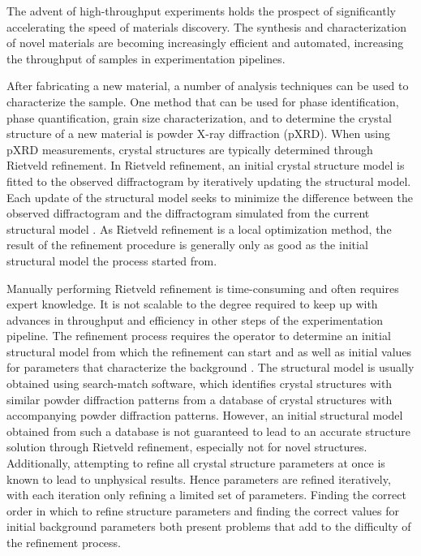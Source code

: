 The advent of high-throughput experiments holds the prospect of significantly accelerating the speed of materials discovery\cite{Liu2019}. The synthesis and characterization of novel materials are becoming increasingly efficient and automated, increasing the throughput of samples in experimentation pipelines\cite{MacLeod2019, Ludwig2019, Ozaki2020}.

After fabricating a new material, a number of analysis techniques can be used to characterize the sample. One method that can be used for phase identification, phase quantification, grain size characterization, and to determine the crystal structure of a new material is powder X-ray diffraction (pXRD). 
When using pXRD measurements, crystal structures are typically determined through Rietveld refinement. In Rietveld refinement, an initial crystal structure model is fitted to the observed diffractogram by iteratively updating the structural model. Each update of the structural model seeks to minimize the difference between the observed diffractogram and the diffractogram simulated from the current structural model \cite{Dinnebier2019, Cano2021}. As Rietveld refinement is a local optimization method, the result of the refinement procedure is generally only as good as the initial structural model the process started from.

Manually performing Rietveld refinement is time-consuming and often requires expert knowledge. It is not scalable to the degree required to keep up with advances in throughput and efficiency in other steps of the experimentation pipeline. The refinement process requires the operator to determine an initial structural model from which the refinement can start and as well as initial values for parameters that characterize the background \cite{mccusker1999}. The structural model is usually obtained using search-match software, which identifies crystal structures with similar powder diffraction patterns from a database of crystal structures with accompanying powder diffraction patterns. However, an initial structural model obtained from such a database is not guaranteed to lead to an accurate structure solution through Rietveld refinement, especially not for novel structures. Additionally, attempting to refine all crystal structure parameters at once is known to lead to unphysical results\cite{Ozaki2020}. Hence parameters are refined iteratively, with each iteration only refining a limited set of parameters. Finding the correct order in which to refine structure parameters and finding the correct values for initial background parameters both present problems that add to the difficulty of the refinement process.

